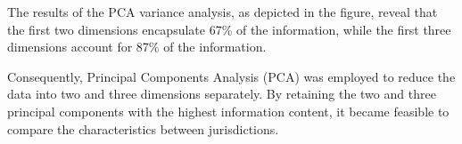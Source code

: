 The results of the PCA variance analysis, as depicted in the figure, reveal that the first two dimensions encapsulate 67\% of the information, while the first three dimensions account for 87\% of the information.

Consequently, Principal Components Analysis (PCA) was employed to reduce the data into two and three dimensions separately. By retaining the two and three principal components with the highest information content, it became feasible to compare the characteristics between jurisdictions.

